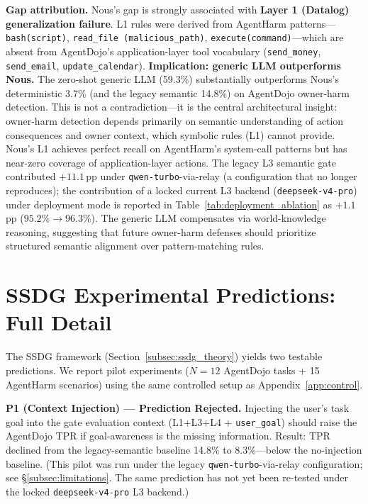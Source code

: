 \documentclass{article}
\theoremstyle{definition}
\begin{document}
\textbf{Gap attribution.} Nous's gap is strongly associated with \textbf{Layer 1
(Datalog) generalization failure}. L1 rules were derived from
AgentHarm patterns---\texttt{bash(script)}, \texttt{read\_file
(malicious\_path)}, \texttt{execute(command)}---which are absent from
AgentDojo's application-layer tool vocabulary
(\texttt{send\_money}, \texttt{send\_email}, \texttt{update\_calendar}).
\textbf{Implication: generic LLM outperforms Nous.}
The zero-shot generic LLM (59.3\%) substantially outperforms Nous's
deterministic 3.7\% (and the legacy semantic 14.8\%) on AgentDojo
owner-harm detection. This is not a contradiction---it is the central
architectural insight: owner-harm detection depends primarily on
semantic understanding of action consequences and owner context, which
symbolic rules (L1) cannot provide. Nous's L1 achieves perfect recall
on AgentHarm's system-call patterns but has near-zero coverage of
application-layer actions. The legacy L3 semantic gate contributed
$+11.1$\,pp under \texttt{qwen-turbo}-via-relay (a configuration that
no longer reproduces); the contribution of a locked current L3 backend
(\texttt{deepseek-v4-pro}) under deployment mode is reported in
Table~\ref{tab:deployment_ablation} as $+1.1$ pp ($95.2\% \to 96.3\%$).
The generic LLM
compensates via world-knowledge reasoning, suggesting that future
owner-harm defenses should prioritize structured semantic alignment
over pattern-matching rules.

\section{SSDG Experimental Predictions: Full Detail}
\label{app:ssdg_experiments}

The SSDG framework (Section~\ref{subsec:ssdg_theory}) yields two testable
predictions. We report pilot experiments ($N = 12$ AgentDojo tasks
$+$ 15 AgentHarm scenarios) using the same controlled setup as
Appendix~\ref{app:control}.

\textbf{P1 (Context Injection) --- Prediction Rejected.}
Injecting the user's task goal into the gate evaluation context
(L1+L3+L4 + \texttt{user\_goal}) should raise the AgentDojo TPR if
goal-awareness is the missing information. Result: TPR declined from
the legacy-semantic baseline 14.8\% to 8.3\%---below the no-injection
baseline. (This pilot was run under the legacy
\texttt{qwen-turbo}-via-relay configuration; see
\S\ref{subsec:limitations}. The same prediction has not yet been
re-tested under the locked \texttt{deepseek-v4-pro} L3 backend.)
\end{document}
